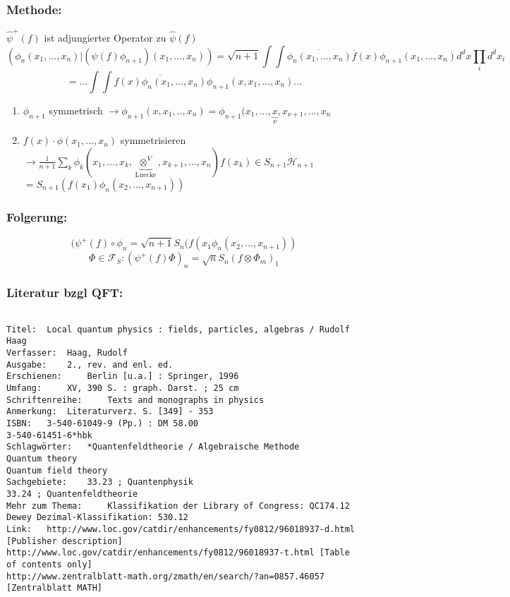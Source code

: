 \documentclass[twoside,a4paper]{scrartcl}
\renewcommand{\1}{\mathds{1}}
\newcommand{\ra}{\rightarrow}
\renewcommand{\H}{\mathcal{H}}
\newcommand{\F}{\mathcal{F}}
\begin{document}
\subsubsection*{Methode:}
$\hat \psi^+(f)$ ist adjungierter Operator zu $\hat \psi(f)$
$$(\phi_n(x_1,...,x_n)|(\psi(f)\phi_{n+1})(x_1,...,x_n))=\sqrt{n+1}\int \int \overline{\phi_n(x_1,...,x_n)}\overline{f}(x) \phi_{n+1}(x_1,...,x_n)d^dx \prod_i d^dx_i$$
$$=...\int \int \overline{f(x)\phi_n(x_1,...,x_n)} \phi_{n+1}(x,x_1,...,x_n)...$$
\begin{enumerate}
\item $\phi_{n+1}$ symmetrisch $\ra \phi_{n+1}(x,x_1,..,x_n)=\phi_{n+1}(x_1,...,\underbrace{x}_{\nu},x_{\nu+1},...,x_n$
\item $f(x) \cdot \phi(x_1,...,x_n)$ symmetrisieren $\ra \frac{1}{n+1} \sum_k \phi_k(x_1,...,x_k,\underbrace{\otimes^V}_{\mathrm{Luecke}},x_{k+1},...,x_n)f(x_k) \in S_{n+1}\H_{n+1}$\\
$=S_{n+1}(f(x_1)\phi_n(x_2,...,x_{n+1}))$
\end{enumerate}
\subsubsection*{Folgerung:}
$$(\psi^+(f)\circ \phi_n=\sqrt{n+1} S_n (f(x_1 \phi_n(x_2,...,x_{n+1}))$$
$$\Phi \in \F_S: (\psi^+(f)\Phi)_n=\sqrt{n} S_n(f \otimes \Phi_m)_1 $$
\subsubsection*{Literatur bzgl QFT:}
\begin{tiny}
\begin{verbatim}

Titel: 	Local quantum physics : fields, particles, algebras / Rudolf Haag
Verfasser: 	Haag, Rudolf
Ausgabe: 	2., rev. and enl. ed.
Erschienen: 	Berlin [u.a.] : Springer, 1996
Umfang: 	XV, 390 S. : graph. Darst. ; 25 cm
Schriftenreihe: 	Texts and monographs in physics
Anmerkung: 	Literaturverz. S. [349] - 353
ISBN: 	3-540-61049-9 (Pp.) : DM 58.00
3-540-61451-6*hbk
Schlagwörter: 	*Quantenfeldtheorie / Algebraische Methode
Quantum theory
Quantum field theory
Sachgebiete: 	33.23 ; Quantenphysik
33.24 ; Quantenfeldtheorie
Mehr zum Thema: 	Klassifikation der Library of Congress: QC174.12
Dewey Dezimal-Klassifikation: 530.12
Link: 	http://www.loc.gov/catdir/enhancements/fy0812/96018937-d.html [Publisher description]
http://www.loc.gov/catdir/enhancements/fy0812/96018937-t.html [Table of contents only]
http://www.zentralblatt-math.org/zmath/en/search/?an=0857.46057 [Zentralblatt MATH]

\end{verbatim}
\end{tiny}
\end{document}
